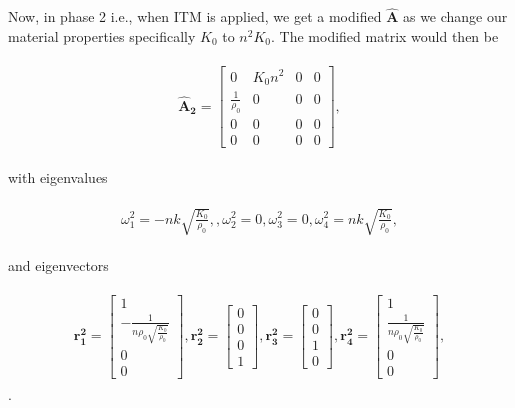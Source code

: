 Now, in phase 2 i.e., when ITM is applied, we get a modified $\mathbf{\hat{A}}$ as we change our material properties specifically $K_0$ to $n^2K_0$. The modified matrix would then be

\begin{align}
    \begin{split}
    \mathbf{\hat{A}_2} = \begin{bmatrix}
        0 & K_{0} n^{2} & 0 & 0 \\
\frac{1}{\rho_{0}} & 0 & 0 & 0 \\
0 & 0 & 0 & 0 \\
0 & 0 & 0 & 0
    \end{bmatrix},
    \end{split}
\end{align}

with eigenvalues

\begin{align}
    \begin{split}
    \omega_1^2 = -n k \sqrt{\frac{K_{0}}{\rho_{0}}},,
    \omega_2^2 = 0,
    \omega_3^2 = 0,
    \omega_4^2 = n k \sqrt{\frac{K_{0}}{\rho_{0}}},
\end{split}
\end{align}

and eigenvectors

\begin{align}
    \begin{split}
    \mathbf{r_1^2} = \begin{bmatrix}
        1 \\
-\frac{1}{n \rho_{0} \sqrt{\frac{K_{0}}{\rho_{0}}}} \\
0 \\
0
        \end{bmatrix},
        \mathbf{r_2^2} = \begin{bmatrix}
            0 \\
0 \\
0 \\
1
            \end{bmatrix},
            \mathbf{r_3^2} = \begin{bmatrix}
                0 \\
                0 \\
                1 \\
                0
                \end{bmatrix},
                \mathbf{r_4^2} = \begin{bmatrix}
                    1 \\
                    \frac{1}{n \rho_{0} \sqrt{\frac{K_{0}}{\rho_{0}}}} \\
                    0 \\
                    0                    
                \end{bmatrix},
    \end{split}
\end{align} .

